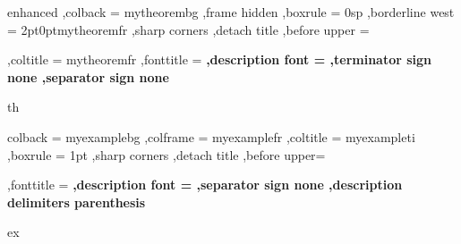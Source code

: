   {%
     enhanced
    ,colback = mytheorembg
    ,frame hidden
    ,boxrule = 0sp
    ,borderline west = {2pt}{0pt}{mytheoremfr}
    ,sharp corners
    ,detach title
    ,before upper = \tcbtitle\par\smallskip
    ,coltitle = mytheoremfr
    ,fonttitle = \bfseries\sffamily
    ,description font = \mdseries
    ,terminator sign none
    ,separator sign none
  }
  {th}
  {%
     colback = myexamplebg
    ,colframe = myexamplefr
    ,coltitle = myexampleti
    ,boxrule = 1pt
    ,sharp corners
    ,detach title
    ,before upper=\tcbtitle\par\smallskip
    ,fonttitle = \bfseries
    ,description font = \mdseries
    ,separator sign none
    ,description delimiters parenthesis
  }
  {ex}


\newcommand{\etal}{\text{et al.}}
\newcommand{\eg}{\text{e.g. }}
\newcommand{\cf}{\text{c.f. }}
\newcommand{\ie}{\text{i.e. }}
\newcommand{\etc}{\text{etc.}}


\newcommand{\bbA}{\mathbb{A}}
\newcommand{\bbB}{\mathbb{B}}
\newcommand{\bbC}{\mathbb{C}}
\newcommand{\bbD}{\mathbb{D}}
\newcommand{\bbE}{\mathbb{E}}
\newcommand{\bbF}{\mathbb{F}}
\newcommand{\bbG}{\mathbb{G}}
\newcommand{\bbH}{\mathbb{H}}
\newcommand{\bbI}{\mathbb{I}}
\newcommand{\bbJ}{\mathbb{J}}
\newcommand{\bbK}{\mathbb{K}}
\newcommand{\bbL}{\mathbb{L}}
\newcommand{\bbM}{\mathbb{M}}
\newcommand{\bbN}{\mathbb{N}}
\newcommand{\bbO}{\mathbb{O}}
\newcommand{\bbP}{\mathbb{P}}
\newcommand{\bbQ}{\mathbb{Q}}
\newcommand{\bbR}{\mathbb{R}}
\newcommand{\bbS}{\mathbb{S}}
\newcommand{\bbT}{\mathbb{T}}
\newcommand{\bbU}{\mathbb{U}}
\newcommand{\bbV}{\mathbb{V}}
\newcommand{\bbW}{\mathbb{W}}
\newcommand{\bbX}{\mathbb{X}}
\newcommand{\bbY}{\mathbb{Y}}
\newcommand{\bbZ}{\mathbb{Z}}

\newcommand{\rmA}{\mathrm{A}}
\newcommand{\rmB}{\mathrm{B}}
\newcommand{\rmC}{\mathrm{C}}
\newcommand{\rmD}{\mathrm{D}}
\newcommand{\rmE}{\mathrm{E}}
\newcommand{\rmF}{\mathrm{F}}
\newcommand{\rmG}{\mathrm{G}}
\newcommand{\rmH}{\mathrm{H}}
\newcommand{\rmI}{\mathrm{I}}
\newcommand{\rmJ}{\mathrm{J}}
\newcommand{\rmK}{\mathrm{K}}
\newcommand{\rmL}{\mathrm{L}}
\newcommand{\rmM}{\mathrm{M}}
\newcommand{\rmN}{\mathrm{N}}
\newcommand{\rmO}{\mathrm{O}}
\newcommand{\rmP}{\mathrm{P}}
\newcommand{\rmQ}{\mathrm{Q}}
\newcommand{\rmR}{\mathrm{R}}
\newcommand{\rmS}{\mathrm{S}}
\newcommand{\rmT}{\mathrm{T}}
\newcommand{\rmU}{\mathrm{U}}
\newcommand{\rmV}{\mathrm{V}}
\newcommand{\rmW}{\mathrm{W}}
\newcommand{\rmX}{\mathrm{X}}
\newcommand{\rmY}{\mathrm{Y}}
\newcommand{\rmZ}{\mathrm{Z}}

